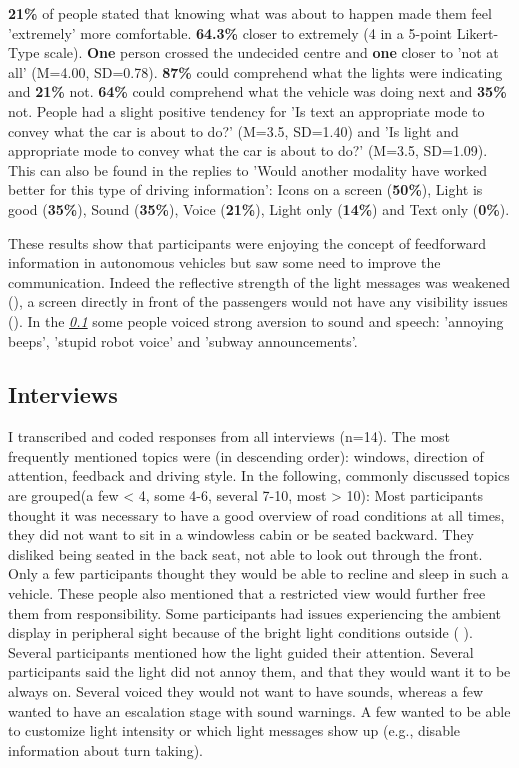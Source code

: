 \textbf{21\%} of people stated that knowing what was about to happen made them feel 'extremely' more comfortable. \textbf{64.3\%} closer to extremely (4 in a 5-point Likert-Type scale). \textbf{One} person crossed the undecided centre and \textbf{one} closer to 'not at all' (M=4.00, SD=0.78). \textbf{87\%} could comprehend what the lights were indicating and \textbf{21\%} not. \textbf{64\%} could comprehend what the vehicle was doing next and \textbf{35\%} not. People had a slight positive tendency for 'Is text an appropriate mode to convey what the car is about to do?' (M=3.5, SD=1.40) and  'Is light and appropriate mode to convey what the car is about to do?' (M=3.5, SD=1.09). This can also be found in the replies to 'Would another modality have worked better for this type of driving information': Icons on a screen (\textbf{50\%}), Light is good (\textbf{35\%}), Sound (\textbf{35\%}), Voice (\textbf{21\%}), Light only (\textbf{14\%}) and Text only (\textbf{0\%}). 

These results show that participants were enjoying the concept of feedforward information in autonomous vehicles but saw some need to improve the communication. Indeed the reflective strength of the light messages was weakened (\emph{}), a screen directly in front of the passengers would not have any visibility issues (\emph{}). In the \emph{\ref{ssec:interviews}} some people voiced strong aversion to sound and speech: 'annoying beeps', 'stupid robot voice' and 'subway announcements'. 

\subsection{Interviews}
\label{ssec:interviews}

I transcribed and coded responses from all interviews (n=14). The most frequently mentioned topics were (in descending order): windows, direction of attention, feedback and driving style. In the following, commonly discussed topics are grouped(a few < 4, some 4-6, several 7-10, most > 10): Most participants thought it was necessary to have a good overview of road conditions at all times, they did not want to sit in a windowless cabin or be seated backward. They disliked being seated in the back seat, not able to look out through the front. Only a few participants thought they would be able to recline and sleep in such a vehicle. These people also mentioned that a restricted view would further free them from responsibility. Some participants had issues experiencing the ambient display in peripheral sight because of the bright light conditions outside ( \emph{}). Several participants mentioned how the light guided their attention. Several participants said the light did not annoy them, and that they would want it to be always on. Several voiced they would not want to have sounds, whereas a few wanted to have an escalation stage with sound warnings. A few wanted to be able to customize light intensity or which light messages show up (e.g., disable information about turn taking).

